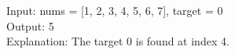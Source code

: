 \documentclass[preview]{standalone}
\begin{document}
Input: nums = [1, 2, 3, 4, 5, 6, 7], target = 0\\Output: 5\\Explanation: The target 0 is found at index 4.\\
\end{document}
